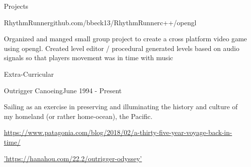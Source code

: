 \documentclass{resume} %
\begin{document}
\begin{rSection}{Projects} \itemsep -2pt
\begin{rSubsection}{RhythmRunner}{github.com/bbeck13/RhythmRunner}{c++/opengl}{}
\item Organized and manged small group project to create a cross platform video game using opengl. Created level editor / procedural generated levels based on audio signals so that players movement was in time with music

\end{rSubsection}

\end{rSection}

\begin{rSection}{Extra-Curricular}
\begin{rSubsection} {Outrigger Canoeing}{June 1994 - Present}{}{}
\item Sailing as an exercise in preserving and illuminating the history and culture of my homeland (or rather home-ocean), the Pacific.
\item \href{https://www.patagonia.com/blog/2018/02/a-thirty-five-year-voyage-back-in-time/}{https://www.patagonia.com/blog/2018/02/a-thirty-five-year-voyage-back-in-time/}
\item \href{https://hanahou.com/22.2/outrigger-odyssey}{'https://hanahou.com/22.2/outrigger-odyssey'}
\end{rSubsection}
\end{rSection}
\end{document}
